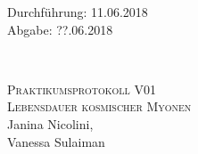 



\begin{titlepage}
  \begin{flushleft}
 Durchführung: 11.06.2018\\
 Abgabe: ??.06.2018
  \end{flushleft}


\HRule\\[1,0cm]

 \begin{center}


\textsc{\LARGE Praktikumsprotokoll V01}\\[1.5cm]
\textsc{\huge Lebensdauer kosmischer Myonen} \\[5,5cm]

Janina Nicolini\footnotemark[1], \\
Vanessa Sulaiman\footnotemark[2] \\[1,0cm]



 \end{center}
\HRule

 \vfill

\end{titlepage}






\printbibliography


